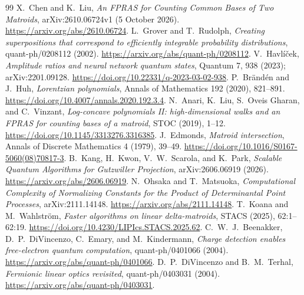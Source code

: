 \documentclass[11pt]{article}
\theoremstyle{remark}
\begin{document}
\begin{thebibliography}{99}\small
{} X.~Chen and K.~Liu, \emph{An FPRAS for Counting Common Bases of Two Matroids}, arXiv:2610.06724v1 (5 October 2026). \url{https://arxiv.org/abs/2610.06724}.
 L.~Grover and T.~Rudolph, \emph{Creating superpositions that correspond to efficiently integrable probability distributions}, quant-ph/0208112 (2002). \url{https://arxiv.org/abs/quant-ph/0208112}.
 V.~Havl\'{i}\v{c}ek, \emph{Amplitude ratios and neural network quantum states}, Quantum 7, 938 (2023); arXiv:2201.09128. \url{https://doi.org/10.22331/q-2023-03-02-938}.
 P.~Br\"and\'en and J.~Huh, \emph{Lorentzian polynomials}, Annals of Mathematics 192 (2020), 821--891. \url{https://doi.org/10.4007/annals.2020.192.3.4}.
 N.~Anari, K.~Liu, S.~Oveis Gharan, and C.~Vinzant, \emph{Log-concave polynomials II: high-dimensional walks and an FPRAS for counting bases of a matroid}, STOC (2019), 1--12. \url{https://doi.org/10.1145/3313276.3316385}.
 J.~Edmonds, \emph{Matroid intersection}, Annals of Discrete Mathematics 4 (1979), 39--49. \url{https://doi.org/10.1016/S0167-5060(08)70817-3}.
 B.~Kang, H.~Kwon, V.~W.~Scarola, and K.~Park, \emph{Scalable Quantum Algorithms for Gutzwiller Projection}, arXiv:2606.06919 (2026). \url{https://arxiv.org/abs/2606.06919}.
 N.~Ohsaka and T.~Matsuoka, \emph{Computational Complexity of Normalizing Constants for the Product of Determinantal Point Processes}, arXiv:2111.14148. \url{https://arxiv.org/abs/2111.14148}.
 T.~Koana and M.~Wahlstr\"om, \emph{Faster algorithms on linear delta-matroids}, STACS (2025), 62:1--62:19. \url{https://doi.org/10.4230/LIPIcs.STACS.2025.62}.
 C.~W.~J.~Beenakker, D.~P.~DiVincenzo, C.~Emary, and M.~Kindermann, \emph{Charge detection enables free-electron quantum computation}, quant-ph/0401066 (2004). \url{https://arxiv.org/abs/quant-ph/0401066}.
 D.~P.~DiVincenzo and B.~M.~Terhal, \emph{Fermionic linear optics revisited}, quant-ph/0403031 (2004). \url{https://arxiv.org/abs/quant-ph/0403031}.
\end{thebibliography}
\end{document}
